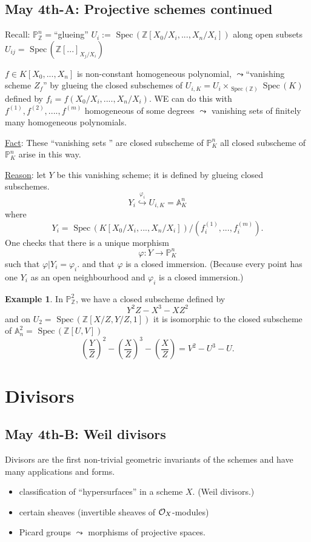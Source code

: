 \documentclass[11pt]{article}
\theoremstyle{definition}
\newtheorem{ex}[thm]{Example}
\newcommand{\spec}{\text{ Spec}\,}
\newcommand{\affn}{\mathbb A}
\newcommand{\proj}{\mathbb P}
\newcommand{\intg}{\mathbb Z}
\newcommand{\calo}{{\cal O}}
\newcommand{\lrta}{\longrightarrow}
\newcommand{\inj}{\hookrightarrow}
\begin{document}
\subsection{May 4th-A: Projective schemes continued}
Recall: $\proj^n_\intg=$``glueing'' $U_i:=\spec(\intg[
X_0/X_i,..., X_n/X_i])$ along open subsets $U_{ij}=\spec(\intg[...]_{X_j/X_i})$

$f\in K[X_0,...,X_n]$ is non-constant homogeneous polynomial, $\leadsto$``vanishing scheme $Z_f$'' by  glueing the closed subschemes of $U_{i,K}=U_i\times_{\spec(\intg)}\spec (K)$ defined by $f_i=f(X_0/X_i,....,X_n/X_i)$. WE can do this with $f^{(1)},f^{(2)},....,f^{(m)}$ homogeneous of some degrees $\leadsto $ vanishing sets of finitely many homogeneous polynomials.

\underline{Fact}: These ``vanishing sets '' are closed subscheme of $\proj^n_K$ all closed subscheme of $\proj^n_K$ arise in this way.

\underline{Reason}: let $Y$ be this vanishing scheme; it is defined by glueing closed subschemes.
$$
Y_i\overset{\varphi_i}{\inj} U_{i,K}=\affn^n_K
$$
where 
$$
Y_i=\spec(K[X_0/X_i,...,X_n/X_i])/(f_i^{(1)},...,f_i^{(m)}).  
$$
One checks that there is a unique morphism
$$
\varphi:Y\lrta \proj^n_K
$$
such that  $\varphi|Y_i=\varphi_i$. and that $\varphi$ is a closed immersion. (Because every point has one $Y_i$ as an open neighbourhood
and $\varphi_i$ is a closed immersion.)

\begin{ex}
In $\proj^2_\intg$, we have a closed subscheme defined by 
$$
Y^2Z-X^3-XZ^2
$$
and on $U_2=\spec(\intg[X/Z,Y/Z,1])$ it is isomorphic to the closed subscheme of $\affn^2_n=\spec(\intg[U,V])$
$$
\left(\frac{Y}{Z}\right)^2-\left(\frac{X}{Z}\right)^3-\left(\frac{X}{Z}\right)=V^2-U^3-U.
$$
\end{ex}


\section{Divisors}
\subsection{May 4th-B: Weil divisors}
Divisors are the first non-trivial geometric invariants of the schemes and have many applications and forms.
\begin{itemize}
	\item classification of ``hypersurfaces'' in a scheme $X$. (Weil divisors.)
	\item certain sheaves (invertible sheaves of $\calo_X$-modules)
	\item Picard groups $\leadsto$ morphisms of projective spaces.
\end{itemize}
\end{document}
